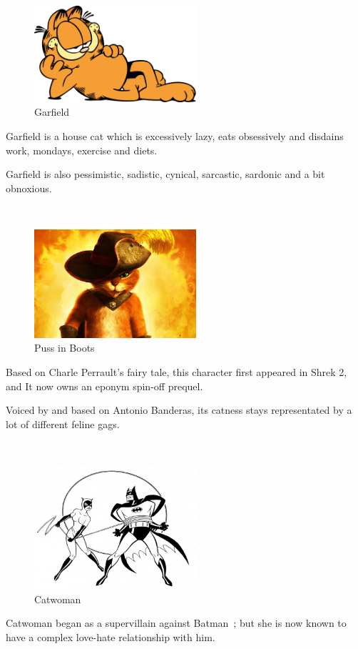 \documentclass[a0,portrait,20pt]{a0poster}
\begin{document}
\begin{multicols}{2}
~

\begin{figure}\includegraphics[width=6cm]{garfield.png}\caption{Garfield}\end{figure}
Garfield is a house cat which is excessively lazy, eats obsessively and disdains work, mondays, exercise and diets.

Garfield is also pessimistic, sadistic, cynical, sarcastic, sardonic and a bit obnoxious.

~

\begin{figure}\includegraphics[width=6cm]{puss.png}\caption{Puss in Boots}\end{figure}
Based on Charle Perrault's fairy tale, this character first appeared in Shrek 2, and It now owns an eponym spin-off prequel.

Voiced by and based on Antonio Banderas, its catness stays representated by a lot of different feline gags.

~

\begin{figure}\includegraphics[width=6cm]{catwoman.png}\caption{Catwoman}\end{figure}
Catwoman began as a supervillain against Batman ; but she is now known to have a complex love-hate relationship with him.


\end{multicols}
\end{document}
